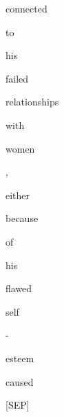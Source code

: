 \documentclass[varwidth=150mm]{standalone}
\begin{document}
\begin{CJK*}{UTF8}{gbsn}
{{{\colorbox{red!1.1098964214324951}{\strut connected} \colorbox{red!0.0}{\strut to} \colorbox{red!5.275213718414307}{\strut his} \colorbox{red!0.0}{\strut failed} \colorbox{red!0.0}{\strut relationships} \colorbox{red!1.154219150543213}{\strut with} \colorbox{red!2.126533031463623}{\strut women} \colorbox{red!2.8757457733154297}{\strut ,} \colorbox{red!0.0}{\strut either} \colorbox{red!0.0}{\strut because} \colorbox{red!0.0}{\strut of} \colorbox{red!4.188627243041992}{\strut his} \colorbox{red!1.8918758630752563}{\strut flawed} \colorbox{red!0.0}{\strut self} \colorbox{red!0.0}{\strut -} \colorbox{red!1.0441060066223145}{\strut esteem} \colorbox{red!2.7408108711242676}{\strut caused} \colorbox{red!1.9289149045944214}{\strut [SEP]}
}}}
\end{CJK*}
\end{document}
